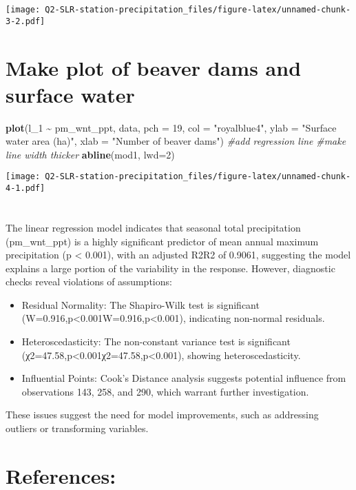 \documentclass[
]{article}
\newenvironment{Shaded}{\begin{snugshade}}{\end{snugshade}}
\newcommand{\AttributeTok}[1]{\textcolor[rgb]{0.13,0.29,0.53}{#1}}
\newcommand{\CommentTok}[1]{\textcolor[rgb]{0.56,0.35,0.01}{\textit{#1}}}
\newcommand{\DecValTok}[1]{\textcolor[rgb]{0.00,0.00,0.81}{#1}}
\newcommand{\FunctionTok}[1]{\textcolor[rgb]{0.13,0.29,0.53}{\textbf{#1}}}
\newcommand{\NormalTok}[1]{#1}
\newcommand{\SpecialCharTok}[1]{\textcolor[rgb]{0.81,0.36,0.00}{\textbf{#1}}}
\newcommand{\StringTok}[1]{\textcolor[rgb]{0.31,0.60,0.02}{#1}}
\providecommand{\tightlist}{%
  \setlength{\itemsep}{0pt}\setlength{\parskip}{0pt}}
\begin{document}
\texttt{[image: Q2-SLR-station-precipitation\_files/figure-latex/unnamed-chunk-3-2.pdf]}

\section{Make plot of beaver dams and surface
water}\label{make-plot-of-beaver-dams-and-surface-water}

\begin{Shaded}
\begin{Highlighting}[]
\FunctionTok{plot}\NormalTok{(l\_1 }\SpecialCharTok{\textasciitilde{}}\NormalTok{ pm\_wnt\_ppt, data, }
     \AttributeTok{pch =} \DecValTok{19}\NormalTok{, }
     \AttributeTok{col =} \StringTok{"royalblue4"}\NormalTok{,}
     \AttributeTok{ylab =} \StringTok{"Surface water area (ha)"}\NormalTok{,}
     \AttributeTok{xlab =}  \StringTok{"Number of beaver dams"}\NormalTok{)}
\CommentTok{\#add regression line}
\CommentTok{\#make line width thicker}
\FunctionTok{abline}\NormalTok{(mod1, }\AttributeTok{lwd=}\DecValTok{2}\NormalTok{)}
\end{Highlighting}
\end{Shaded}

\texttt{[image: Q2-SLR-station-precipitation\_files/figure-latex/unnamed-chunk-4-1.pdf]}

\section{}\label{section}

The linear regression model indicates that seasonal total precipitation
(pm\_wnt\_ppt) is a highly significant predictor of mean annual maximum
precipitation (p \textless{} 0.001), with an adjusted R2R2 of 0.9061,
suggesting the model explains a large portion of the variability in the
response. However, diagnostic checks reveal violations of assumptions:

\begin{itemize}
\tightlist
\item
  Residual Normality: The Shapiro-Wilk test is significant
  (W=0.916,p\textless0.001W=0.916,p\textless0.001), indicating
  non-normal residuals.
\item
  Heteroscedasticity: The non-constant variance test is significant
  (χ2=47.58,p\textless0.001χ2=47.58,p\textless0.001), showing
  heteroscedasticity.
\item
  Influential Points: Cook's Distance analysis suggests potential
  influence from observations 143, 258, and 290, which warrant further
  investigation.
\end{itemize}

These issues suggest the need for model improvements, such as addressing
outliers or transforming variables.

\section{References:}\label{references}
\end{document}
